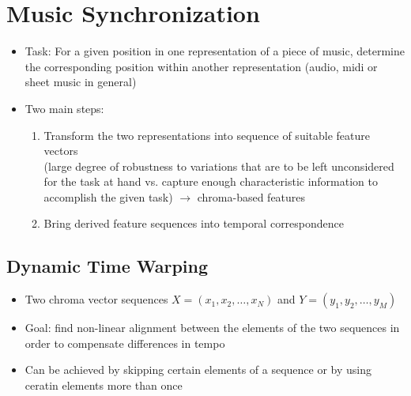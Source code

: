 \documentclass{scrartcl}
\begin{document}
\newpage

\section{Music Synchronization}
\begin{itemize}
    \item
        Task: For a given position in one representation of a piece of music, determine the corresponding position within another representation (audio, midi or sheet music in general)
    \item
        Two main steps:
        \begin{enumerate}
            \item
                Transform the two representations into sequence of suitable feature vectors\\
                (large degree of robustness to variations that are to be left unconsidered for the task at hand vs. capture enough characteristic information to accomplish the given task) $\rightarrow$ chroma-based features
            \item
                Bring derived feature sequences into temporal correspondence
        \end{enumerate}
\end{itemize}
\subsection*{Dynamic Time Warping}
\begin{itemize}
    \item
        Two chroma vector sequences $X = (x_1, x_2, \dots, x_N)$ and $Y = (y_1, y_2, \dots, y_M)$
    \item
        Goal: find non-linear alignment between the elements of the two sequences in order to compensate differences in tempo
    \item
        Can be achieved by skipping certain elements of a sequence or by using ceratin elements more than once
\end{itemize}
\end{document}
